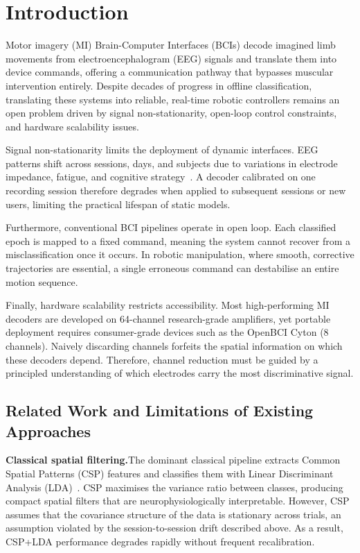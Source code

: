 \documentclass[12pt, a4paper]{article}
\begin{document}
\newpage
\tableofcontents
\newpage

\section{Introduction}

Motor imagery (MI) Brain-Computer Interfaces (BCIs) decode imagined limb movements from electroencephalogram (EEG) signals and translate them into device commands, offering a communication pathway that bypasses muscular intervention entirely. Despite decades of progress in offline classification, translating these systems into reliable, real-time robotic controllers remains an open problem driven by signal non-stationarity, open-loop control constraints, and hardware scalability issues.

Signal non-stationarity limits the deployment of dynamic interfaces. EEG patterns shift across sessions, days, and subjects due to variations in electrode impedance, fatigue, and cognitive strategy~\cite{hameed2025enhancing}. A decoder calibrated on one recording session therefore degrades when applied to subsequent sessions or new users, limiting the practical lifespan of static models.

Furthermore, conventional BCI pipelines operate in open loop. Each classified epoch is mapped to a fixed command, meaning the system cannot recover from a misclassification once it occurs. In robotic manipulation, where smooth, corrective trajectories are essential, a single erroneous command can destabilise an entire motion sequence.

Finally, hardware scalability restricts accessibility. Most high-performing MI decoders are developed on 64-channel research-grade amplifiers, yet portable deployment requires consumer-grade devices such as the OpenBCI Cyton (8 channels). Naively discarding channels forfeits the spatial information on which these decoders depend. Therefore, channel reduction must be guided by a principled understanding of which electrodes carry the most discriminative signal.

\subsection{Related Work and Limitations of Existing Approaches}

\textbf{Classical spatial filtering.}\quad The dominant classical pipeline extracts Common Spatial Patterns (CSP) features and classifies them with Linear Discriminant Analysis (LDA)~\cite{hameed2025enhancing}. CSP maximises the variance ratio between classes, producing compact spatial filters that are neurophysiologically interpretable. However, CSP assumes that the covariance structure of the data is stationary across trials, an assumption violated by the session-to-session drift described above. As a result, CSP+LDA performance degrades rapidly without frequent recalibration.
\end{document}
